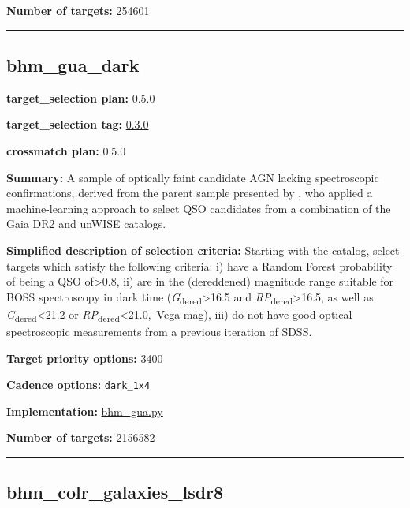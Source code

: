 \noindent\textbf{Number of targets:} 254601

\begin{center}\rule{0.5\linewidth}{0.5pt}\end{center}

\hypertarget{bhm_gua_dark_plan0.5.0}{%
\subsection{bhm\_gua\_dark}\label{bhm_gua_dark_plan0.5.0}}

\noindent\textbf{target\_selection plan:} 0.5.0

\noindent\textbf{target\_selection tag:}
\href{https://github.com/sdss/target_selection/tree/0.3.0/}{0.3.0}

\noindent\textbf{crossmatch plan:} 0.5.0

\noindent\textbf{Summary:} A sample of optically faint candidate AGN lacking
spectroscopic confirmations, derived from the parent sample presented by
\citet{Shu2019}, who applied a machine-learning approach to select QSO
candidates from a combination of the Gaia DR2 and unWISE catalogs.

\noindent\textbf{Simplified description of selection criteria:} Starting with the
\citet{Shu2019} catalog, select targets which satisfy the following
criteria: i) have a Random Forest probability of being a QSO
of\textgreater0.8, ii) are in the (dereddened) magnitude range suitable
for BOSS spectroscopy in dark time
(\emph{G}\textsubscript{dered}\textgreater16.5 and
\emph{RP}\textsubscript{dered}\textgreater16.5, as well as
\emph{G}\textsubscript{dered}\textless21.2 or
\emph{RP}\textsubscript{dered}\textless21.0,~Vega mag), iii) do not have
good optical spectroscopic measurements from a previous iteration of
SDSS.


\noindent\textbf{Target priority options:} 3400

\noindent\textbf{Cadence options:} \texttt{dark\_1x4}

\noindent\textbf{Implementation:}
\href{https://github.com/sdss/target_selection/blob/0.3.0/python/target_selection/cartons/bhm_gua.py}{bhm\_gua.py}

\noindent\textbf{Number of targets:} 2156582

\begin{center}\rule{0.5\linewidth}{0.5pt}\end{center}

\hypertarget{bhm_colr_galaxies_lsdr8_plan0.5.16}{%
\subsection{bhm\_colr\_galaxies\_lsdr8}\label{bhm_colr_galaxies_lsdr8_plan0.5.16}}

